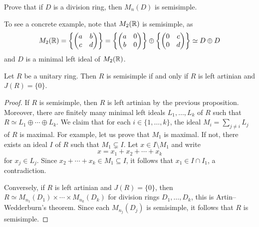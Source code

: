 
\begin{exercise}
\label{xca:M_n(D)_semisimple}
    Prove that if $D$ is a division ring, then 
    $M_n(D)$ is semisimple. 
\end{exercise}

To see a concrete example, note that  
$M_2(\mathbb{R})$ is semisimple, as  
\[
M_2(\mathbb{R})=\left\{\begin{pmatrix}
a&b\\
c&d
\end{pmatrix}\right\}
=
\left\{\begin{pmatrix}
a&0\\
b&0
\end{pmatrix}\right\}
\oplus
\left\{\begin{pmatrix}
0&c\\
0&d
\end{pmatrix}\right\}\simeq D\oplus D
\]
and $D$ is a minimal left ideal of $M_2(\mathbb{R})$. 

\begin{theorem}
	\label{thm:SSartin=J}
	Let $R$ be a unitary ring. Then $R$ is semisimple if and only if 
	$R$ is left artinian and $J(R)=\{0\}$.
\end{theorem}

\begin{proof}
    If $R$ is semisimple, then $R$ is left artinian by the previous proposition. 
    Moreover, 
    there are finitely many 
    minimal left ideals $L_1,\dots,L_k$ of $R$ 
    such that $R\simeq L_1\oplus\cdots\oplus L_k$. We claim that
    for each $i\in\{1,\dots,k\}$, the ideal
    $M_i=\sum_{j\ne i}L_j$ of $R$ is maximal. For example, let us prove
    that $M_1$ is maximal. If not, there exists an ideal $I$ of $R$ 
    such that $M_1\subsetneq I$. Let $x\in I\setminus M_1$ and write 
    \[
    x=x_1+x_2+\cdots+x_k
    \]
    for $x_j\in L_j$. Since $x_2+\cdots+x_k\in M_1\subseteq I$, 
    it follows that $x_1\in I\cap I_1$, a contradiction.  
    
    Conversely, if $R$ is left artinian and $J(R)=\{0\}$, then
    $R\simeq M_{n_1}(D_1)\times\cdots\times M_{n_k}(D_k)$ 
    for division rings $D_1,\dots,D_k$, this is Artin--Wedderburn's theorem. 
    Since each $M_{n_j}(D_j)$ 
    is semisimple, it follows that $R$ is semisimple. 
\end{proof}

